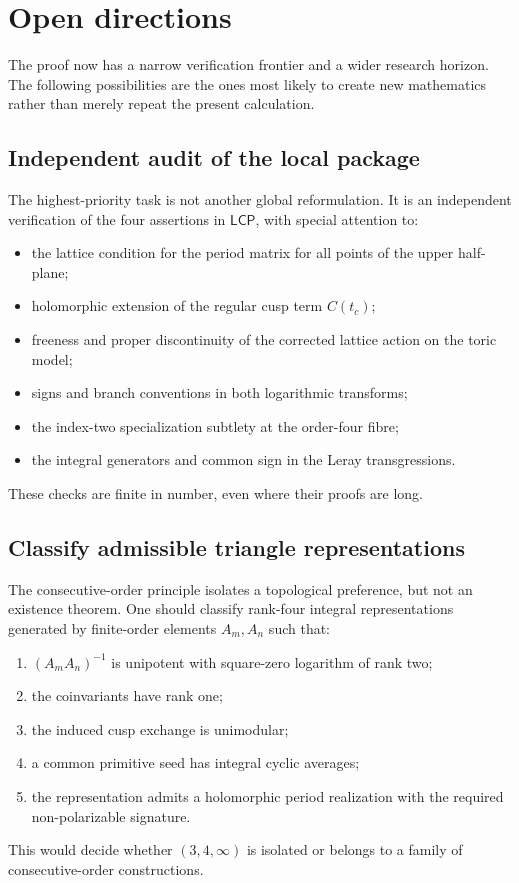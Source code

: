 \documentclass[11pt,reqno]{amsart}
\numberwithin{equation}{section}
\newcommand{\LCP}{\mathsf{LCP}}
\theoremstyle{definition}
\begin{document}
\section{Open directions}\label{sec:open}

The proof now has a narrow verification frontier and a wider research horizon. The following possibilities are the ones most likely to create new mathematics rather than merely repeat the present calculation.

\subsection{Independent audit of the local package}

The highest-priority task is not another global reformulation. It is an independent verification of the four assertions in $\LCP$, with special attention to:
\begin{itemize}
\item the lattice condition for the period matrix for all points of the upper half-plane;
\item holomorphic extension of the regular cusp term $C(t_c)$;
\item freeness and proper discontinuity of the corrected lattice action on the toric model;
\item signs and branch conventions in both logarithmic transforms;
\item the index-two specialization subtlety at the order-four fibre;
\item the integral generators and common sign in the Leray transgressions.
\end{itemize}
These checks are finite in number, even where their proofs are long.

\subsection{Classify admissible triangle representations}

The consecutive-order principle isolates a topological preference, but not an existence theorem. One should classify rank-four integral representations generated by finite-order elements $A_m,A_n$ such that:
\begin{enumerate}
\item $(A_mA_n)^{-1}$ is unipotent with square-zero logarithm of rank two;
\item the coinvariants have rank one;
\item the induced cusp exchange is unimodular;
\item a common primitive seed has integral cyclic averages;
\item the representation admits a holomorphic period realization with the required non-polarizable signature.
\end{enumerate}
This would decide whether $(3,4,\infty)$ is isolated or belongs to a family of consecutive-order constructions.
\end{document}
